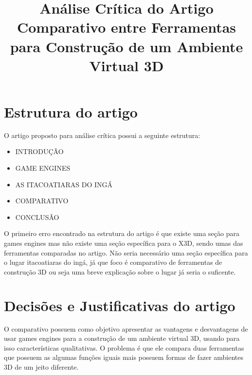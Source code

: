 \documentclass[conference]{IEEEtran}
\begin{document}
\title{ Análise Crítica do Artigo Comparativo entre Ferramentas para Construção de
um Ambiente Virtual 3D\\}

\author{
\and
{}

\and
{}
}

\maketitle
\section*{Estrutura do artigo}
O artigo proposto para análise crítica possui a seguinte estrutura:
\begin{itemize}
\item INTRODUÇÃO
\item GAME ENGINES
\item AS ITACOATIARAS DO INGÁ
\item COMPARATIVO
\item CONCLUSÃO
\end{itemize}
O primeiro erro encontrado na estrutura do artigo é que existe uma seção para games engines mas não existe uma seção específica para o X3D, sendo umas das ferramentas comparadas no artigo. Não seria necessário uma seção específica para o lugar itacoatiaras do ingá, já que foco é comparativo de ferramentas de construção 3D ou seja uma breve explicação sobre o lugar já seria o suficente.
\section*{Decisões e Justificativas do artigo}
O comparativo possuem como objetivo apresentar as vantagens e desvantagens de usar games engines para a construção de um ambiente virtual 3D, usando para isso características qualitativas. O problema é que ele compara duas ferramentas que possuem as algumas funções iguais mais possuem formas de fazer ambientes 3D de um jeito diferente.
\end{document}
